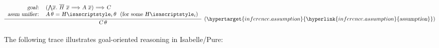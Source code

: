 \begin{isabellebody}
\begin{isamarkuptext}
  \medskip

  \[
  \infer[(\indexdef{}{inference}{assumption}\hypertarget{inference.assumption}{\hyperlink{inference.assumption}{\mbox{\isa{assumption}}}})]{\isa{{\isaliteral{22}{\isachardoublequote}}C{\isaliteral{5C3C76617274686574613E}{\isasymvartheta}}{\isaliteral{22}{\isachardoublequote}}}}
  {\begin{tabular}{rl}
    \isa{{\isaliteral{22}{\isachardoublequote}}goal{\isaliteral{3A}{\isacharcolon}}{\isaliteral{22}{\isachardoublequote}}} &
    \isa{{\isaliteral{22}{\isachardoublequote}}{\isaliteral{28}{\isacharparenleft}}{\isaliteral{5C3C416E643E}{\isasymAnd}}\isaliteral{5C3C5E7665633E}{}\isactrlvec x{\isaliteral{2E}{\isachardot}}\ \isaliteral{5C3C5E7665633E}{}\isactrlvec H\ \isaliteral{5C3C5E7665633E}{}\isactrlvec x\ {\isaliteral{5C3C4C6F6E6772696768746172726F773E}{\isasymLongrightarrow}}\ A\ \isaliteral{5C3C5E7665633E}{}\isactrlvec x{\isaliteral{29}{\isacharparenright}}\ {\isaliteral{5C3C4C6F6E6772696768746172726F773E}{\isasymLongrightarrow}}\ C{\isaliteral{22}{\isachardoublequote}}} \\
    \isa{{\isaliteral{22}{\isachardoublequote}}assm\ unifier{\isaliteral{3A}{\isacharcolon}}{\isaliteral{22}{\isachardoublequote}}} & \isa{{\isaliteral{22}{\isachardoublequote}}A{\isaliteral{5C3C76617274686574613E}{\isasymvartheta}}\ {\isaliteral{3D}{\isacharequal}}\ H\isaliteral{5C3C5E7375623E}{}\isactrlsub i{\isaliteral{5C3C76617274686574613E}{\isasymvartheta}}{\isaliteral{22}{\isachardoublequote}}}~~\text{(for some~\isa{{\isaliteral{22}{\isachardoublequote}}H\isaliteral{5C3C5E7375623E}{}\isactrlsub i{\isaliteral{22}{\isachardoublequote}}})} \\
   \end{tabular}}
  \]

  The following trace illustrates goal-oriented reasoning in
  Isabelle/Pure:


\end{isamarkuptext}
\end{isabellebody}
